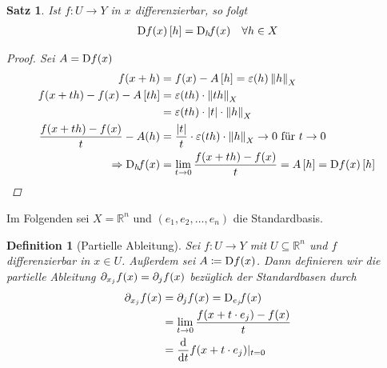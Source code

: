 \documentclass[11pt, twoside, a4paper]{article}
\theoremstyle{plain}
\newtheorem{definition}[blockelement]{Definition}
\newtheorem{satz}[blockelement]{Satz}
\numberwithin{equation}{subsection}
\newcommand{\pair}[1]{\left(#1\right)}
\newcommand{\of}[1]{\mathopen{}\mathclose{}\bgroup\left(#1\aftergroup\egroup\right)}
\newcommand{\abs}[1]{\left\lvert#1\right\rvert}
\newcommand{\norm}[1]{\left\lVert#1\right\rVert}
\newcommand{\interv}[1]{\left[#1\right]}
\newcommand{\impl}[0]{\Rightarrow{}}
\newcommand{\fromto}{\rightarrow{}}
\newcommand{\dif}{\mathop{}\!\mathrm{d}}
\DeclareMathOperator{\D}{D\!}
\newcommand{\R}{\mathbb{R}}
\begin{document}
    \begin{satz} %
        Ist $f: U\fromto Y$ in $x$ differenzierbar, so folgt
        \begin{align*}
            \D f\of{x}\interv{h} = \text{D}_h\!f\of{x}\quad\forall h\in X
        \end{align*}
        \begin{proof}
            Sei $A = \D f\of{x}$
            \begin{align*}
                f\of{x+h} &= f\of{x} - A\interv{h} = \varepsilon\of{h}\norm{h}_X\\
                f\of{x+th} - f\of{x} - A\interv{th} &= \varepsilon\of{th}\cdot\norm{th}_X\\
                &= \varepsilon\of{th}\cdot\abs{t}\cdot\norm{h}_X\\
                \frac{f\of{x+th} - f\of{x}}{t} - A\of{h} &= \frac{\abs{t}}{t}\cdot\varepsilon\of{th} \cdot\norm{h}_X\fromto 0 \text{ für } t\fromto 0\\
                \impl \text{D}_h\!f\of{x} &= \lim_{t\fromto 0} \frac{f\of{x+th}- f\of{x}}{t} = A\interv{h} = \D f\of{x}\interv{h}\qedhere
            \end{align*}
        \end{proof}
    \end{satz}

    \begin{mdframed}
        \begin{center}
            Im Folgenden sei $X=\R^n$ und $\pair{e_1, e_2, \ldots, e_n}$ die Standardbasis.
        \end{center}
    \end{mdframed}

    \begin{definition}[Partielle Ableitung]
        Sei $f: U\fromto Y$ mit $U\subseteq \R^n$ und $f$ differenzierbar in $x\in U$. Außerdem sei $A \coloneqq \D f\of{x}$. Dann definieren wir die partielle Ableitung $\partial_{x_j} f\of{x} = \partial_j f\of{x}$ bezüglich der Standardbasen durch
        \begin{align*}
            \partial_{x_j} f\of{x} &= \partial_j f\of{x} = \text{D}_{e_j}\! f\of{x}\\
            &= \lim_{t\fromto 0} \frac{f\of{x+t\cdot e_j} - f\of{x}}{t}\\
            &= \frac{\dif}{\dif t}f\of{x+t\cdot e_j}\vert_{t = 0}
        \end{align*}
    \end{definition}
\end{document}
